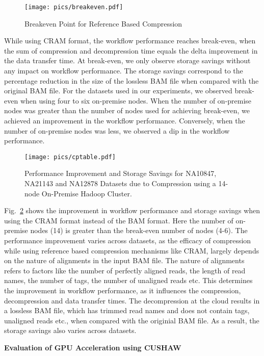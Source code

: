 \begin{figure}[!htbp]
  \centering
  \texttt{[image: pics/breakeven.pdf]}
  \caption{Breakeven Point for Reference Based Compression}
  \label{fig:breakeven}
\end{figure}

While using CRAM format, the workflow performance reaches break-even, when the sum of compression and decompression time equals the delta improvement in the data transfer time. At break-even, we only observe storage savings without any impact on workflow performance. The storage savings correspond to the percentage reduction in the size of the lossless BAM file when compared with the original BAM file. For the datasets used in our experiments, we observed break-even when using four to six on-premise nodes. When the number of on-premise nodes was greater than the number of nodes used for achieving break-even, we achieved an improvement in the workflow performance. Conversely, when the number of on-premise nodes was less, we observed a dip in the workflow performance.

\begin{figure}[!htbp]
  \centering
  \texttt{[image: pics/cptable.pdf]}
  \caption{Performance Improvement and Storage Savings for NA10847, NA21143 and 
NA12878 Datasets due to Compression using a 14-node On-Premise Hadoop Cluster.}
  \label{fig:cptable}
\end{figure}

Fig.~\ref{fig:cptable} shows the improvement in workflow performance and storage savings when using the CRAM format instead of the BAM format. Here the number of on-premise nodes (14) is greater than the break-even number of nodes (4-6). The performance improvement varies across datasets, as the efficacy of compression while using reference based compression mechanisms like CRAM, largely depends on the nature of alignments in the input BAM file. The nature of alignments refers to factors like the number of perfectly aligned reads, the length of read names, the number of tags, the number of unaligned reads etc. This determines the improvement in workflow performance, as it influences the compression, decompression and data transfer times. The decompression at the cloud results in a lossless BAM file, which has trimmed read names and does not contain tags, unaligned reads etc., when compared with the originial BAM file. As a result, the storage savings also varies across datasets.

\noindent\textbf{Evaluation of GPU Acceleration using CUSHAW}

